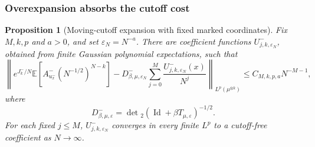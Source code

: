 \documentclass[11pt,reqno]{amsart}
\numberwithin{equation}{section}
\theoremstyle{plain}
\newtheorem{prop}[prop]{Proposition}
\theoremstyle{definition}
\newcommand{\E}{\mathbb E}
\newcommand{\Id}{\operatorname{Id}}
\newcommand{\be}{\beta}
\newcommand{\vep}{\varepsilon}
\begin{document}
\subsubsection{Overexpansion absorbs the cutoff cost}

\begin{prop}[Moving-cutoff expansion with fixed marked coordinates]\label{rep:prop:moving-cutoff}
Fix $M,k,p$ and $a>0$, and set $\vep_N=N^{-a}$. There are coefficient functions $U^-_{j,k,\vep_N}$, obtained from finite Gaussian polynomial expectations, such that
\begin{equation}\label{rep:eq:moving-cutoff-expansion}
 \left\|e^{J_k^-/N}\E\left[A^-_{u_x^-}(N^{-1/2})^{N-k}\right]
 -D^-_{\be,\mu,\vep_N}
 \sum_{j=0}^{M}\frac{U^-_{j,k,\vep_N}(x)}{N^j}
 \right\|_{L^p(\mu^{\otimes k})}
 \le C_{M,k,p,a}N^{-M-1},
\end{equation}
where
\begin{equation}\label{rep:eq:D-epsilon}
 D^-_{\be,\mu,\vep}
 =\det{}_2(\Id+\be T_{\mu,\vep})^{-1/2}.
\end{equation}
For each fixed $j\le M$, $U^-_{j,k,\vep_N}$ converges in every finite $L^p$ to a cutoff-free coefficient as $N\to\infty$.
\end{prop}
\end{document}
